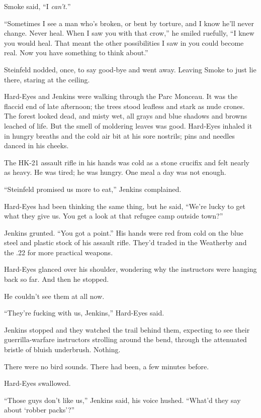 Smoke said, ``I \textit{can't.}''

``Sometimes I see a man who's broken, or bent by torture, and I know he'll never change. Never heal. When I saw you with that crow,'' he smiled ruefully, ``I knew you would heal. That meant the other possibilities I saw in you could become real. Now you have something to think about.''

Steinfeld nodded, once, to say good-bye and went away. Leaving Smoke to just lie there, staring at the ceiling.

Hard-Eyes and Jenkins were walking through the Parc Monceau. It was the flaccid end of late afternoon; the trees stood leafless and stark as nude crones. The forest looked dead, and misty wet, all grays and blue shadows and browns leached of life. But the smell of moldering leaves was good. Hard-Eyes inhaled it in hungry breaths and the cold air bit at his sore nostrils; pins and needles danced in his cheeks.

The HK-21 assault rifle in his hands was cold as a stone crucifix and felt nearly as heavy. He was tired; he was hungry. One meal a day was not enough.

``Steinfeld promised us more to eat,'' Jenkins complained.

Hard-Eyes had been thinking the same thing, but he said, ``We're lucky to get what they give us. You get a look at that refugee camp outside town?''

Jenkins grunted. ``You got a point.'' His hands were red from cold on the blue steel and plastic stock of his assault rifle. They'd traded in the Weatherby and the .22 for more practical weapons.

Hard-Eyes glanced over his shoulder, wondering why the instructors were hanging back so far. And then he stopped.

He couldn't see them at all now.

``They're fucking with us, Jenkins,'' Hard-Eyes said.

Jenkins stopped and they watched the trail behind them, expecting to see their guerrilla-warfare instructors strolling around the bend, through the attenuated bristle of bluish underbrush. Nothing.

There were no bird sounds. There had been, a few minutes before.

Hard-Eyes swallowed.

``Those guys don't like us,'' Jenkins said, his voice hushed. ``What'd they say about ‘robber packs'?''

